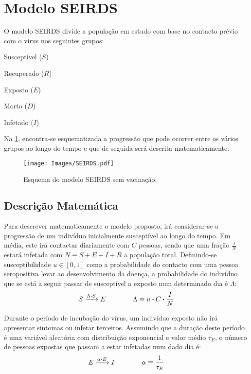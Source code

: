 \section{Modelo SEIRDS}
O modelo SEIRDS divide a população em estudo com base no contacto prévio com o vírus nos seguintes grupos:
\begin{itemize}\begin{multicols}{3}
        \item Susceptível ($S$)
        \item Recuperado ($R$)
        \item Exposto ($E$)
        \item Morto ($D$)
        \item Infetado ($I$)
\end{multicols}\end{itemize}

Na \ref{fig:Model}, encontra-se esquematizada a progressão que pode ocorrer entre os vários grupos ao longo do tempo e que de seguida será descrita matematicamente.
\begin{figure}[H]\centering
        \texttt{[image: Images/SEIRDS.pdf]}
        \caption{Esquema do modelo SEIRDS sem vacinação.}
\label{fig:Model}\end{figure}

\subsection{Descrição Matemática}
Para descrever matematicamente o modelo proposto, irá considerar-se a progressão de um indivíduo inicialmente susceptível ao longo do tempo.
Em média, este irá contactar diariamente com $C$ pessoas, sendo que uma fração $\frac{I}{N}$ estará infetada com $N\equiv S+E+I+R$ a população total.
Definindo-se susceptibilidade $u\in[0,1]$ como a probabilidade do contacto com uma pessoa seropositiva levar ao desenvolvimento da doença, a probabilidade do indivíduo que se está a seguir passar de susceptível a exposto num determinado dia é $\Lambda$:
\begin{equation*}
        S \xrightarrow{\Lambda\vdot S} E
        \qquad\qquad
        \Lambda \equiv u\vdot C \vdot \frac{I}{N}
\end{equation*}

Durante o período de incubação do vírus, um indivíduo exposto não irá apresentar sintomas ou infetar terceiros.
Assumindo que a duração deste período é uma variável aleatória com distribuição exponencial e valor médio $\tau_E$, o número de pessoas expostas que passam a estar infetadas num dado dia é:
\begin{equation*}
        E \xrightarrow{\alpha\vdot E} I
        \qquad\qquad
        \alpha \equiv \frac{1}{\tau_E}
\end{equation*}

